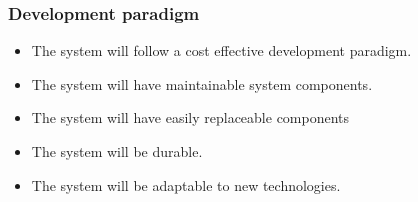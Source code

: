 \subsubsection{Development paradigm}
    \begin{itemize}
        \item The system will follow a cost effective development paradigm.
        \item The system will have maintainable system components.
        \item The system will have easily replaceable components
        \item The system will be durable.
        \item The system will be adaptable to new technologies.
    \end{itemize}
